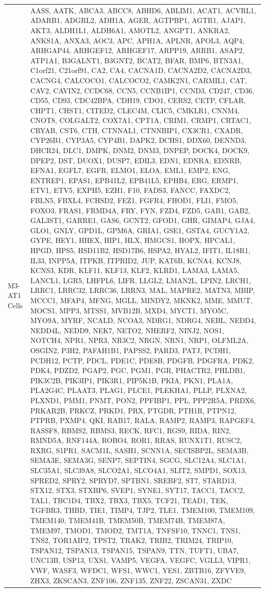 \documentclass[
]{article}
\begin{document}
\begin{singlespace}
\begin{longtable}[t]{>{\raggedright\arraybackslash}p{1in}>{\raggedright\arraybackslash}p{5in}}
M3-AT1 Cells & AASS, AATK, ABCA3, ABCC8, ABHD6, ABLIM1, ACAT1, ACVRL1, ADARB1, ADGRL2, ADH1A, AGER, AGTPBP1, AGTR1, AJAP1, AKT3, ALDH1L1, ALDH6A1, AMOTL2, ANGPT1, ANKRA2, ANKS1A, ANXA3, AOC3, APC, APH1A, APLNR, APOL3, AQP4, ARHGAP44, ARHGEF12, ARHGEF17, ARPP19, ARRB1, ASAP2, ATP1A1, B3GALNT1, B3GNT2, BCAT2, BFAR, BMP6, BTN3A1, C1orf21, C21orf91, CA2, CA4, CACNA1D, CACNA2D2, CACNA2D3, CACNG4, CALCOCO1, CALCOCO2, CAMK2N1, CARMIL1, CAT, CAV2, CAVIN2, CCDC68, CCN5, CCNB1IP1, CCND3, CD247, CD36, CD55, CD93, CDC42BPA, CDH19, CDO1, CERS2, CETP, CFLAR, CHPT1, CHST1, CITED2, CLEC4M, CLIC5, CMKLR1, CNNM4, CNOT8, COLGALT2, COX7A1, CPT1A, CRIM1, CRMP1, CRTAC1, CRYAB, CST6, CTH, CTNNAL1, CTNNBIP1, CX3CR1, CXADR, CYP26B1, CYP3A5, CYP4B1, DAPK2, DCHS1, DDX60, DENND3, DHCR24, DLC1, DMPK, DNM2, DNM3, DNPEP, DOCK4, DOCK9, DPEP2, DST, DUOX1, DUSP7, EDIL3, EDN1, EDNRA, EDNRB, EFNA1, EGFL7, EGFR, ELMO1, ELOA, EML1, EMP2, ENG, ENTREP1, EPAS1, EPB41L2, EPB41L5, EPHB4, ERG, ERMP1, ETV1, ETV5, EXPH5, EZH1, F10, FADS3, FANCC, FAXDC2, FBLN5, FBXL4, FCHSD2, FEZ1, FGFR4, FHOD1, FLI1, FMO5, FOXO3, FRAS1, FRMD4A, FRY, FYN, FZD4, FZD5, GAB1, GAB2, GAL3ST1, GARRE1, GAS6, GCNT2, GFOD1, GHR, GIMAP4, GJA4, GLO1, GNLY, GPD1L, GPM6A, GRIA1, GSE1, GSTA4, GUCY1A2, GYPE, HEY1, HHEX, HIP1, HLX, HMGCS1, HOPX, HPCAL1, HPGD, HPS5, HSD11B2, HSD17B6, HSPA2, HYAL2, IFIT1, IL18R1, IL33, INPP5A, ITPKB, ITPRID2, JUP, KAT6B, KCNA4, KCNJ8, KCNS3, KDR, KLF11, KLF13, KLF2, KLRD1, LAMA3, LAMA5, LANCL1, LGR5, LHFPL6, LIFR, LLGL2, LMAN2L, LPIN2, LRCH1, LRRC1, LRRC32, LRRC36, LRRN3, MAL, MAPRE2, MATN3, MBIP, MCCC1, MFAP4, MFNG, MGLL, MINDY2, MKNK2, MME, MMUT, MOCS1, MPP3, MTSS1, MVB12B, MXD4, MYCT1, MYO5C, MYO9A, MYRF, NCALD, NCOA3, NDRG1, NDRG4, NEBL, NEDD4, NEDD4L, NEDD9, NEK7, NETO2, NHERF2, NINJ2, NOS1, NOTCH4, NPR1, NPR3, NR3C2, NRGN, NRN1, NRP1, OLFML2A, OSGIN2, P3H2, PAFAH1B1, PAPSS2, PARD3, PATJ, PCDH1, PCDH12, PCTP, PDCL, PDE1C, PDE8B, PDGFB, PDGFRA, PDK2, PDK4, PDZD2, PGAP2, PGC, PGM1, PGR, PHACTR2, PHLDB1, PIK3C2B, PIK3IP1, PIK3R1, PIP5K1B, PKIA, PKN1, PLA1A, PLA2G4C, PLAAT3, PLAG1, PLCE1, PLEKHA1, PLLP, PLXNA2, PLXND1, PMM1, PNMT, PON2, PPFIBP1, PPL, PPP2R5A, PRDX6, PRKAR2B, PRKCZ, PRKD1, PRX, PTGDR, PTH1R, PTPN12, PTPRB, PXMP4, QKI, RAB17, RALA, RAMP2, RAMP3, RAPGEF4, RASSF8, RBMS2, RBMS3, RECK, RFC1, RGS9, RIDA, RIN2, RMND5A, RNF144A, ROBO4, ROR1, RRAS, RUNX1T1, RUSC2, RXRG, S1PR1, SACM1L, SASH1, SCNN1A, SECISBP2L, SEMA3B, SEMA3E, SEMA3G, SENP7, SEPTIN4, SGCG, SLC12A4, SLC1A1, SLC35A1, SLC39A8, SLCO2A1, SLCO4A1, SLIT2, SMPD1, SOX13, SPRED2, SPRY2, SPRYD7, SPTBN1, SREBF2, ST7, STARD13, STX12, STX3, STXBP6, SVEP1, SYNE1, SYT17, TACC1, TACC2, TAL1, TBC1D4, TBX2, TBX3, TBX5, TCF21, TEAD1, TEK, TGFBR3, THBD, TIE1, TIMP4, TJP2, TLE1, TMEM100, TMEM109, TMEM140, TMEM41B, TMEM50B, TMEM74B, TMEM87A, TMEM97, TMOD1, TMOD2, TMT1A, TNFSF10, TNNC1, TNS1, TNS2, TOR1AIP2, TPST2, TRAK2, TRIB2, TRIM24, TRIP10, TSPAN12, TSPAN13, TSPAN15, TSPAN9, TTN, TUFT1, UBA7, UNC13B, USP13, UXS1, VAMP5, VEGFA, VEGFC, VGLL3, VIPR1, VWF, WASF3, WFDC1, WFS1, WWC1, YES1, ZBTB16, ZFYVE9, ZHX3, ZKSCAN3, ZNF106, ZNF135, ZNF22, ZSCAN31, ZXDC\\

\end{longtable}
\end{singlespace}
\end{document}
